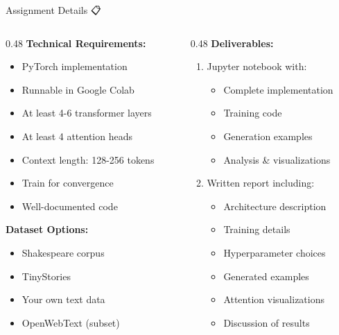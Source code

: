 \documentclass[aspectratio=169]{beamer}
\begin{document}
\begin{frame}{Assignment Details 📋}
\begin{columns}[T]
\begin{column}{0.48\textwidth}
\textbf{Technical Requirements:}
\begin{itemize}
    \item PyTorch implementation
    \item Runnable in Google Colab
    \item At least 4-6 transformer layers
    \item At least 4 attention heads
    \item Context length: 128-256 tokens
    \item Train for convergence
    \item Well-documented code
\end{itemize}

\vspace{0.5em}

\textbf{Dataset Options:}
\begin{itemize}
    \item Shakespeare corpus
    \item TinyStories
    \item Your own text data
    \item OpenWebText (subset)
\end{itemize}
\end{column}

\begin{column}{0.48\textwidth}
\textbf{Deliverables:}
\begin{enumerate}
    \item Jupyter notebook with:
    \begin{itemize}
        \item Complete implementation
        \item Training code
        \item Generation examples
        \item Analysis \& visualizations
    \end{itemize}
    \item Written report including:
    \begin{itemize}
        \item Architecture description
        \item Training details
        \item Hyperparameter choices
        \item Generated examples
        \item Attention visualizations
        \item Discussion of results
    \end{itemize}
\end{enumerate}


\end{column}
\end{columns}
\end{frame}
\end{document}
